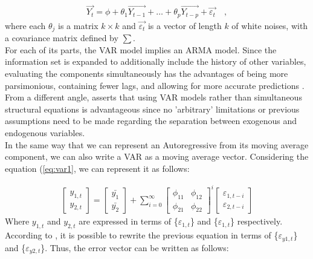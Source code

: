 \begin{align*}
    \overrightarrow{Y_t} = \phi + \theta_1 \overrightarrow{Y_{t-1}} + \dots + \theta_p \overrightarrow{Y_{t-p}} + \overrightarrow{\varepsilon_t} \quad ,
\end{align*}
where each $\theta_j$ is a matrix $k \times k$ and $\overrightarrow{\varepsilon_t}$ is a vector of length $k$ of white noises, with a covariance matrix defined by $\sum$.\\

For each of its parts, the VAR model implies an ARMA model. Since the information set is expanded to additionally include the history of other variables, evaluating the components simultaneously has the advantages of being more parsimonious, containing fewer lags, and allowing for more accurate predictions \cite[p.322]{verbeek2008guide}. From a different angle, \cite{sims1980macroeconomics} asserts that using VAR models rather than simultaneous structural equations is advantageous since no 'arbitrary' limitations or previous assumptions need to be made regarding the separation between exogenous and endogenous variables.\\

In the same way that we can represent an Autoregressive from its moving average component, we can also write a VAR as a moving average vector. Considering the equation (\ref{eq:var1}, we can represent it as follows:

\begin{align} \label{eq:mavar1}
    \begin{bmatrix}
    y_{1,t} \\
    y_{2,t}
    \end{bmatrix} = 
    \begin{bmatrix}
    \bar{y_1}\\
    \bar{y_2}
    \end{bmatrix} + \sum_{i=0}^{\infty}
    \begin{bmatrix}
    \phi_{11} & \phi_{12} \\
    \phi_{21} & \phi_{22}
    \end{bmatrix}^i
    \begin{bmatrix}
    \varepsilon_{1,t-i} \\
    \varepsilon_{2,t-i}
    \end{bmatrix} 
\end{align}
Where $y_{1, t}$ and $y_{2, t}$ are expressed in terms of \{$\varepsilon_{1, t}$\} and \{$\varepsilon_{1, t}$\} respectively. According to \cite{enders2008applied}, it is possible to rewrite the previous equation in terms of \{$\varepsilon_{y1, t}$\} and \{$\varepsilon_{y2, t}$\}. Thus, the error vector can be written as follows:

